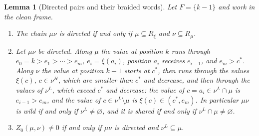 \documentclass[11pt]{article}
\newtheorem{lemma}[proposition]{Lemma}
\begin{document}
\begin{lemma}[Directed pairs and their braided words]\label{lem:directed-pairs}
Let $F=\{k-1\}$ and work in the clean frame.
\begin{enumerate}
\item The chain $\mu\nu$ is directed if and only if $\mu\subseteq R_\xi$
 and $\nu\subseteq R_\mu$.
\item Let $\mu\nu$ be directed. Along $\mu$ the value at position $k$
 runs through $e_0=k>e_1>\cdots>e_m$, $e_i=\xi(a_i)$, position $a_i$
 receives $e_{i-1}$, and $e_m>c^\ast$. Along $\nu$ the value at
 position $k-1$ starts at $c^\ast$, then runs through the values
 $\xi(c)$, $c\in\nu^H$, which are smaller than $c^\ast$ and decrease,
 and then through the values of $\nu^L$, which exceed $c^\ast$ and
 decrease: the value of $c=a_i\in\nu^L\cap\mu$ is $e_{i-1}>e_m$, and
 the value of $c\in\nu^L\setminus\mu$ is $\xi(c)\in(c^\ast,e_m)$. In
 particular $\mu\nu$ is wild if and only if $\nu^L\neq\varnothing$, and
 it is shared if and only if $\nu^L\cap\mu\neq\varnothing$.
\item $Z_0(\mu,\nu)\neq0$ if and only if $\mu\nu$ is directed and
 $\nu^L\subseteq\mu$.
\end{enumerate}
\end{lemma}
\end{document}
